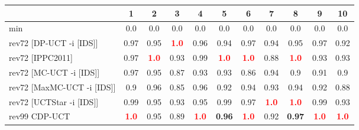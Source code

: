 \documentclass{article}
\begin{document}
\begin{tabular}{|l|r@{$\pm$}rr@{$\pm$}rr@{$\pm$}rr@{$\pm$}rr@{$\pm$}rr@{$\pm$}rr@{$\pm$}rr@{$\pm$}rr@{$\pm$}rr@{$\pm$}r|}
\hline

& \multicolumn{2}{c}{1}
& \multicolumn{2}{c}{2}
& \multicolumn{2}{c}{3}
& \multicolumn{2}{c}{4}
& \multicolumn{2}{c}{5}
& \multicolumn{2}{c}{6}
& \multicolumn{2}{c}{7}
& \multicolumn{2}{c}{8}
& \multicolumn{2}{c}{9}
& \multicolumn{2}{c|}{10}
\\
\hline
\hline
min
& \multicolumn{2}{c}{0.0}
& \multicolumn{2}{c}{0.0}
& \multicolumn{2}{c}{0.0}
& \multicolumn{2}{c}{0.0}
& \multicolumn{2}{c}{0.0}
& \multicolumn{2}{c}{0.0}
& \multicolumn{2}{c}{0.0}
& \multicolumn{2}{c}{0.0}
& \multicolumn{2}{c}{0.0}
& \multicolumn{2}{c|}{0.0}
\\
rev72 [DP-UCT -i [IDS]]
& \multicolumn{2}{c}{0.97}
& \multicolumn{2}{c}{0.95}
& \multicolumn{2}{c}{\textbf{\textcolor{red}{1.0}}}
& \multicolumn{2}{c}{0.96}
& \multicolumn{2}{c}{0.94}
& \multicolumn{2}{c}{0.97}
& \multicolumn{2}{c}{0.94}
& \multicolumn{2}{c}{0.95}
& \multicolumn{2}{c}{0.97}
& \multicolumn{2}{c|}{0.92}
\\
rev72 [IPPC2011]
& \multicolumn{2}{c}{0.97}
& \multicolumn{2}{c}{\textbf{\textcolor{red}{1.0}}}
& \multicolumn{2}{c}{0.93}
& \multicolumn{2}{c}{0.99}
& \multicolumn{2}{c}{\textbf{\textcolor{red}{1.0}}}
& \multicolumn{2}{c}{\textbf{\textcolor{red}{1.0}}}
& \multicolumn{2}{c}{0.88}
& \multicolumn{2}{c}{\textbf{\textcolor{red}{1.0}}}
& \multicolumn{2}{c}{0.93}
& \multicolumn{2}{c|}{0.93}
\\
rev72 [MC-UCT -i [IDS]]
& \multicolumn{2}{c}{0.97}
& \multicolumn{2}{c}{0.95}
& \multicolumn{2}{c}{0.87}
& \multicolumn{2}{c}{0.93}
& \multicolumn{2}{c}{0.93}
& \multicolumn{2}{c}{0.86}
& \multicolumn{2}{c}{0.94}
& \multicolumn{2}{c}{0.9}
& \multicolumn{2}{c}{0.91}
& \multicolumn{2}{c|}{0.9}
\\
rev72 [MaxMC-UCT -i [IDS]]
& \multicolumn{2}{c}{0.9}
& \multicolumn{2}{c}{0.96}
& \multicolumn{2}{c}{0.85}
& \multicolumn{2}{c}{0.96}
& \multicolumn{2}{c}{0.92}
& \multicolumn{2}{c}{0.94}
& \multicolumn{2}{c}{0.93}
& \multicolumn{2}{c}{0.94}
& \multicolumn{2}{c}{0.92}
& \multicolumn{2}{c|}{0.88}
\\
rev72 [UCTStar -i [IDS]]
& \multicolumn{2}{c}{0.99}
& \multicolumn{2}{c}{0.95}
& \multicolumn{2}{c}{0.93}
& \multicolumn{2}{c}{0.95}
& \multicolumn{2}{c}{0.99}
& \multicolumn{2}{c}{0.97}
& \multicolumn{2}{c}{\textbf{\textcolor{red}{1.0}}}
& \multicolumn{2}{c}{\textbf{\textcolor{red}{1.0}}}
& \multicolumn{2}{c}{0.99}
& \multicolumn{2}{c|}{0.93}
\\
\hline
rev99 CDP-UCT
& \multicolumn{2}{c}{\textbf{\textcolor{red}{1.0}}}
& \multicolumn{2}{c}{0.95}
& \multicolumn{2}{c}{0.89}
& \multicolumn{2}{c}{\textbf{\textcolor{red}{1.0}}}
& \multicolumn{2}{c}{\textbf{0.96}}
& \multicolumn{2}{c}{\textbf{\textcolor{red}{1.0}}}
& \multicolumn{2}{c}{0.92}
& \multicolumn{2}{c}{\textbf{0.97}}
& \multicolumn{2}{c}{\textbf{\textcolor{red}{1.0}}}
& \multicolumn{2}{c|}{\textbf{\textcolor{red}{1.0}}}
\\
\hline
\end{tabular}%
\end{document}
